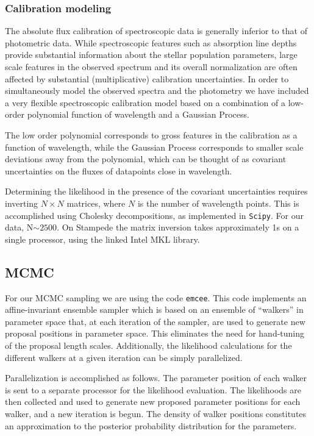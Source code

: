\documentclass[11pt,preprint]{aastex}
\begin{document}
\subsubsection{Calibration modeling}
The absolute flux calibration of spectroscopic data is generally inferior to that of photometric data.  
While spectroscopic features such as absorption line depths provide substantial information about the stellar population parameters, large scale features in the observed spectrum and its overall normalization are often affected by substantial (multiplicative) calibration uncertainties. 
In order to simultaneously model the observed spectra and the photometry we have included a very flexible spectroscopic calibration model based on a combination of a low-order polynomial function of wavelength and a Gaussian Process.

The low order polynomial corresponds to gross features in the calibration as a function of wavelength, while the Gaussian Process corresponds to smaller scale deviations away from the polynomial, which can be thought of as covariant uncertainties on the fluxes of datapoints close in wavelength.

Determining the likelihood in the presence of the covariant uncertainties requires inverting $N \times N$ matrices, where $N$ is the number of wavelength points.  
This is accomplished using Cholesky decompositions, as implemented in \texttt{Scipy}.  
For our data, N$\sim 2500$.  
On Stampede the matrix inversion takes approximately 1s on a single processor, using the linked Intel MKL library.

\subsection{MCMC}
For our MCMC sampling we are using the code \texttt{emcee}.  
This code implements an affine-invariant ensemble sampler \citep{goodman_weare} which is based on an ensemble of ``walkers'' in parameter space that, at each iteration of the sampler, are used to generate new proposal positions in parameter space.  
This eliminates the need for hand-tuning of the proposal length scales.  
Additionally, the likelihood calculations for the different walkers at a given iteration can be simply parallelized.

Parallelization is accomplished as follows. 
The parameter position of each walker is sent to a separate processor for the likelihood evaluation. 
The likelihoods are then collected and used to generate new proposed parameter positions for each walker, and a new iteration is begun.  
The density of walker positions constitutes an approximation to the posterior probability distribution for the parameters.
\end{document}
